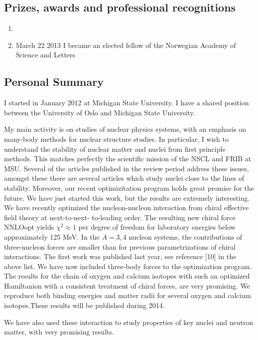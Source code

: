 \documentclass[prc,amsart,english,twocolumn,superscriptaddress,showpacs,floatfix]{revtex4}
\begin{document}
 \subsection*{Prizes, awards and professional recognitions}
\begin{enumerate}
\item 
\item March 22 2013 I became an elected fellow of the Norwegian Academy of Science and Letters

\end{enumerate}

\subsection*{Personal Summary}

I started in January 2012 at Michigan State University. I have a
shared position between the University of Oslo and Michigan State
University.

My main activity is on studies of nuclear physics systems, with an
emphasis on many-body methods for nuclear structure studies. In
particular, I wish to understand the stability of nuclear matter and
nuclei from first principle methods. This matches perfectly the
scientific mission of the NSCL and FRIB at MSU.  Several of the
articles published in the review period address these issues, amongst
these there are several articles which study
nuclei close to the lines of stability.  Moreover, our recent
optimizitation program holds great promise for the future.  We have
just started this work, but the results are extremely interesting.  We
have recently optimized the nucleon-nucleon interaction from chiral
effective field theory at next-to-next- to-leading order. The
resulting new chiral force NNLOopt yields $\chi^2 \approx 1$ per
degree of freedom for laboratory energies below approximately 125
MeV. In the $A = 3, 4$ nucleon systems, the contributions of
three-nucleon forces are smaller than for previous parametrizations of
chiral interactions. 
The first work was published last year, see reference [10] in the above list. We have now included three-body forces
to the optimization program. The results for the chain of oxygen and calcium isotopes with such an optimized Hamiltanion with a consistent treatment of chiral forces, are very promising. We reproduce both binding energies and matter radii for several oxygen and calcium isotopes.These results will be published during 2014. 

We have also used these interaction to study properties
of key nuclei and neutron matter, with very promising results.
\end{document}
